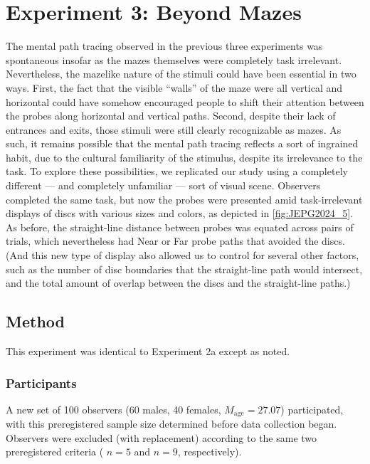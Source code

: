 \section{Experiment 3: Beyond Mazes}
The mental path tracing observed in the previous three experiments was spontaneous insofar as the mazes themselves were completely task irrelevant. Nevertheless, the mazelike nature of the stimuli could have been essential in two ways. First, the fact that the visible “walls” of the maze were all vertical and horizontal could have somehow encouraged people to shift their attention between the probes along horizontal and vertical paths. Second, despite their lack of entrances and exits, those stimuli were still clearly recognizable as mazes. As such, it remains possible that the mental path tracing reflects a sort of ingrained habit, due to the cultural familiarity of the stimulus, despite its irrelevance to the task.
To explore these possibilities, we replicated our study using a completely different --- and completely unfamiliar --- sort of visual scene. Observers completed the same task, but now the probes were presented amid task-irrelevant displays of discs with various sizes and colors, as depicted in \cref{fig:JEPG2024_5}. As before, the straight-line distance between probes was equated across pairs of trials, which nevertheless had Near or Far probe paths that avoided the discs. (And this new type of display also allowed us to control for several other factors, such as the number of disc boundaries that the straight-line path would intersect, and the total amount of overlap between the discs and the straight-line paths.)


\subsection{Method}
This experiment was identical to Experiment 2a except as noted.

\subsubsection{Participants}
A new set of 100 observers (60 males, 40 females, $M_\text{age} = 27.07$) participated, with this preregistered sample size determined before data collection began. Observers were excluded (with replacement) according to the same two preregistered criteria ( $n = 5$ and $n = 9$, respectively).

